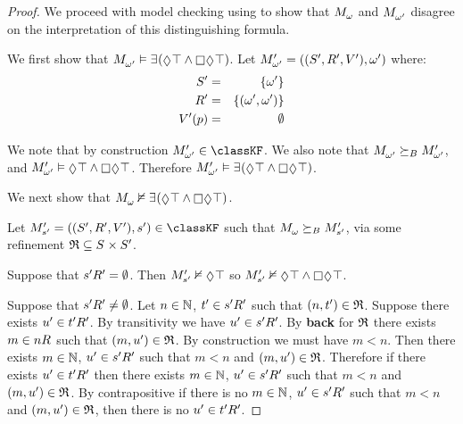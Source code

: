 \begin{proof}
We proceed with model checking using to show that $\kPModel{\omega}$ and $\kPModel{\omega'}$ disagree on the interpretation of this distinguishing formula.

We first show that $\kPModel{\omega'} \entails \somerefs (\possible \top \land \necessary \possible \top)$.
Let $\kPModelAndTupleP{\omega'}$ where:
\begin{eqnarray*}
    {S^{\prime}} &=& \{\omega'\}\\
    {R^{\prime}_{}} &=& \{(\omega', \omega')\}\\
    {V^{\prime}}(p) &=& \emptyset
\end{eqnarray*}

We note that by construction $\kPModelP{\omega'} \in \classKF$.
We also note that $\kPModel{\omega'} \simulatesBs \kPModelP{\omega'}$, and $\kPModelP{\omega'} \entails \possible \top \land \necessary \possible \top$.
Therefore $\kPModelP{\omega'} \entails \somerefs (\possible \top \land \necessary \possible \top)$.

We next show that $\kPModel{\omega} \nentails \somerefs (\possible \top \land \necessary \possible \top)$.

Let $\kPModelAndTupleP{\kStateSP} \in \classKF$ such that $\kPModel{\omega} \simulatesBs \kPModelP{\kStateSP}$, via some refinement $\refinement \subseteq \kStates \times \kStatesP$.

Suppose that ${{s}^{\prime}} {R^{\prime}_{}} = \emptyset$.
Then $\kPModelP{\kStateSP} \nentails \possible \top$ so $\kPModelP{\kStateSP} \nentails \possible \top \land \necessary \possible \top$.

Suppose that ${{s}^{\prime}} {R^{\prime}_{}} \neq \emptyset$.
Let $n \in \mathbb{N}$, ${t}^{\prime} \in {{s}^{\prime}} {R^{\prime}_{}}$ such that $(n, {t}^{\prime}) \in \mathfrak{R}$.
Suppose there exists ${u}^{\prime} \in {{t}^{\prime}} {R^{\prime}_{}}$.
By transitivity we have ${u}^{\prime} \in {{s}^{\prime}} {R^{\prime}_{}}$.
By {\bf back} for $\mathfrak{R}$ there exists $m \in \kSuccessors{}{n}$ such that $(m, {u}^{\prime}) \in \mathfrak{R}$.
By construction we must have $m < n$.
Then there exists $m \in \mathbb{N}$, ${u}^{\prime} \in {{s}^{\prime}} {R^{\prime}_{}}$ such that $m < n$ and $(m, {u}^{\prime}) \in \mathfrak{R}$.
Therefore if there exists ${u}^{\prime} \in {{t}^{\prime}} {R^{\prime}_{}}$ then there exists $m \in \mathbb{N}$, ${u}^{\prime} \in {{s}^{\prime}} {R^{\prime}_{}}$ such that $m < n$ and $(m, {u}^{\prime}) \in \mathfrak{R}$.
By contrapositive if there is no $m \in \mathbb{N}$, ${u}^{\prime} \in {{s}^{\prime}} {R^{\prime}_{}}$ such that $m < n$ and $(m, {u}^{\prime}) \in \mathfrak{R}$, then there is no ${u}^{\prime} \in {{t}^{\prime}} {R^{\prime}_{}}$.


\end{proof}

